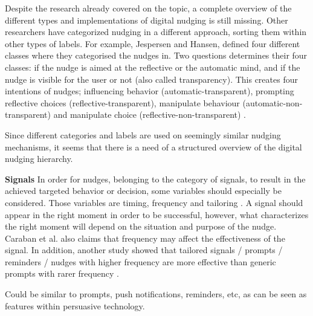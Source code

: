 Despite the research already covered on the topic, a complete overview of the different types and implementations of digital nudging is still missing. Other researchers have categorized nudging in a different approach, sorting them within other types of labels. For example, Jespersen and Hansen\cite{hansen_nudge_2013}, defined four different classes where they categorised the nudges in. %
Two questions determines their four classes: if the nudge is aimed at the reflective or the automatic mind, and if the nudge is visible for the user or not (also called transparency). This creates four intentions of nudges; influencing behavior (automatic-transparent), prompting reflective choices (reflective-transparent), manipulate behaviour (automatic-non-transparent) and manipulate choice (reflective-non-transparent) \cite{hansen_nudge_2013}.

Since different categories and labels are used on seemingly similar nudging mechanisms, it seems that there is a need of a structured overview of the digital nudging hierarchy. 

\bigbreak
\textbf{Signals }
\bigbreak
In order for nudges, belonging to the category of signals, to result in the achieved targeted  behavior or decision, some variables should especially be considered. Those variables are timing, frequency and tailoring \cite{caraban_23_2019}. A signal should appear in the right moment in order to be successful, however, what characterizes the right moment will depend on the situation and purpose of the nudge. Caraban et al. also claims that frequency may affect the effectiveness of the signal. In addition, another study showed that tailored signals / prompts / reminders / nudges with higher frequency are more effective than generic prompts with rarer frequency \cite{fry_periodic_2009}. 

Could be similar to prompts, push notifications, reminders, etc, as can be seen as features within persuasive technology. 

